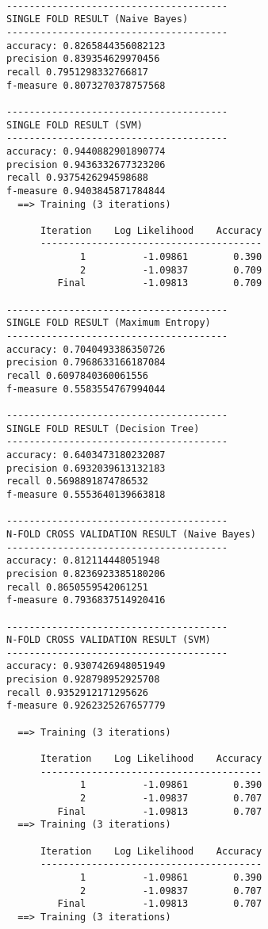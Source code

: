 \documentclass[11pt]{article}
\begin{document}
    \begin{Verbatim}[commandchars=\\\{\}]

---------------------------------------
SINGLE FOLD RESULT (Naive Bayes)
---------------------------------------
accuracy: 0.8265844356082123
precision 0.839354629970456
recall 0.7951298332766817
f-measure 0.8073270378757568

---------------------------------------
SINGLE FOLD RESULT (SVM)
---------------------------------------
accuracy: 0.9440882901890774
precision 0.9436332677323206
recall 0.9375426294598688
f-measure 0.9403845871784844
  ==> Training (3 iterations)

      Iteration    Log Likelihood    Accuracy
      ---------------------------------------
             1          -1.09861        0.390
             2          -1.09837        0.709
         Final          -1.09813        0.709

---------------------------------------
SINGLE FOLD RESULT (Maximum Entropy)
---------------------------------------
accuracy: 0.7040493386350726
precision 0.7968633166187084
recall 0.6097840360061556
f-measure 0.5583554767994044

---------------------------------------
SINGLE FOLD RESULT (Decision Tree)
---------------------------------------
accuracy: 0.6403473180232087
precision 0.6932039613132183
recall 0.5698891874786532
f-measure 0.5553640139663818

---------------------------------------
N-FOLD CROSS VALIDATION RESULT (Naive Bayes)
---------------------------------------
accuracy: 0.812114448051948
precision 0.8236923385180206
recall 0.8650559542061251
f-measure 0.7936837514920416

---------------------------------------
N-FOLD CROSS VALIDATION RESULT (SVM)
---------------------------------------
accuracy: 0.9307426948051949
precision 0.928798952925708
recall 0.9352912171295626
f-measure 0.9262325267657779

  ==> Training (3 iterations)

      Iteration    Log Likelihood    Accuracy
      ---------------------------------------
             1          -1.09861        0.390
             2          -1.09837        0.707
         Final          -1.09813        0.707
  ==> Training (3 iterations)

      Iteration    Log Likelihood    Accuracy
      ---------------------------------------
             1          -1.09861        0.390
             2          -1.09837        0.707
         Final          -1.09813        0.707
  ==> Training (3 iterations)


\end{Verbatim}
\end{document}

